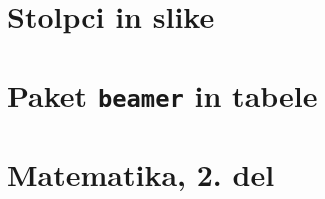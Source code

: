 \documentclass{beamer}
\begin{document}
\section{Stolpci in slike}
\begin{frame}
    
\end{frame}

\section{Paket \texttt{beamer} in tabele}
\begin{frame}
    
\end{frame}

\section[Matematika, 2. del\\\large{Zaporedja, algebra, grupe}]{Matematika, 2. del}
\begin{frame}
    
\end{frame}
\end{document}
